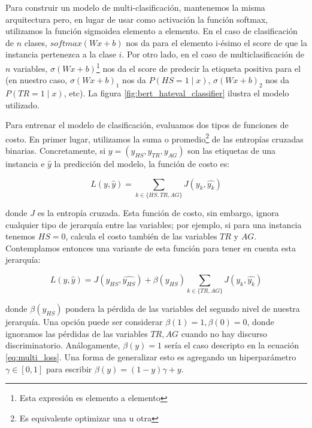 Para construir un modelo de multi-clasificación, mantenemos la misma arquitectura pero, en lugar de usar como activación la función softmax, utilizamos la función sigmoidea elemento a elemento. En el caso de clasificación de $n$ clases, $softmax(W x + b)$ nos da para el elemento i-ésimo el score de que la instancia pertenezca a la clase $i$. Por otro lado, en el caso de multiclasificación de $n$ variables, $\sigma(W x + b)$\footnote{Esta expresión es elemento a elemento} nos da el score de predecir la etiqueta positiva para el (en nuestro caso,  $\sigma(W x + b)_1$ nos da $P( HS = 1 \mid x)$,  $\sigma(W x + b)_2$ nos da  $P(TR = 1 \mid x)$, etc). La figura \ref{fig:bert_hateval_classifier} ilustra el modelo utilizado.

Para entrenar el modelo de clasificación, evaluamos dos tipos de funciones de costo. En primer lugar, utilizamos la suma o promedio\footnote{Es equivalente optimizar una u otra} de las entropías cruzadas binarias. Concretamente, si $y = (y_{HS}, y_{TR}, y_{AG})$ son las etiquetas de una instancia e $\widehat{y}$ la predicción del modelo, la función de costo es:

\begin{equation}
\label{eq:multi_loss}
L(y, \widehat{y}) = \sum\limits_{k \in \{HS, TR, AG\}} J(y_k, \widehat{y_k})
\end{equation}

donde $J$ es la entropía cruzada. Esta función de costo, sin embargo, ignora cualquier tipo de jerarquía entre las variables; por ejemplo, si para una instancia tenemos $HS = 0$, calcula el costo también de las variables $TR$ y $AG$. Contemplamos entonces una variante de esta función para tener en cuenta esta jerarquía:

\begin{equation}
    \label{eq:hierarchical_loss}
    L(y, \widehat{y}) =  J(y_{HS}, \widehat{y_{HS}}) + \beta(y_{HS})\sum\limits_{k \in \{TR, AG\}} J(y_k, \widehat{y_k})
\end{equation}

donde $\beta(y_{HS})$ pondera la pérdida de las variables del segundo nivel de nuestra jerarquía. Una opción puede ser considerar $\beta(1) = 1, \beta(0) = 0$, donde ignoramos las pérdidas de las variables $TR, AG$ cuando no hay discurso discriminatorio. Análogamente, $\beta(y) = 1$ sería el caso descripto en la ecuación \ref{eq:multi_loss}. Una forma de generalizar esto es agregando un hiperparámetro $\gamma \in [0, 1]$ para escribir $\beta(y) = (1-y) \gamma + y$.

